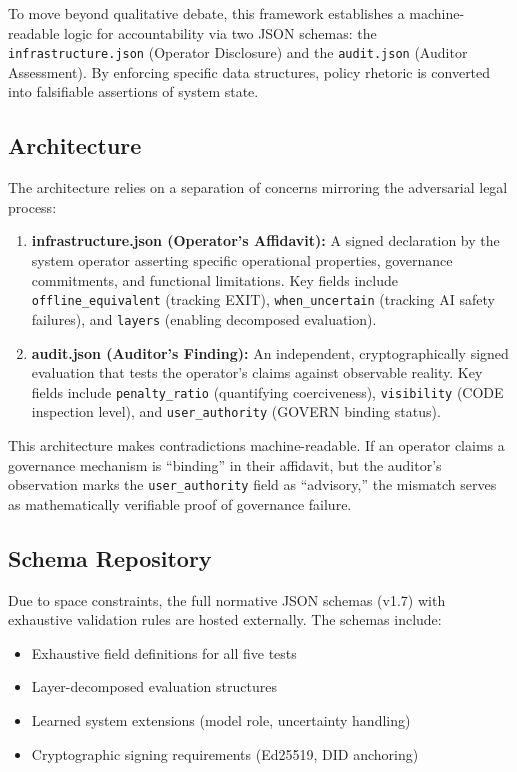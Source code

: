 \documentclass{article}
\begin{document}
\medskip

To move beyond qualitative debate, this framework establishes a machine-readable logic for accountability via two JSON schemas: the \texttt{infrastructure.json} (Operator Disclosure) and the \texttt{audit.json} (Auditor Assessment). By enforcing specific data structures, policy rhetoric is converted into falsifiable assertions of system state.

\subsection{Architecture}

The architecture relies on a separation of concerns mirroring the adversarial legal process:

\begin{enumerate}[noitemsep]
    \item \textbf{infrastructure.json (Operator's Affidavit):} A signed declaration by the system operator asserting specific operational properties, governance commitments, and functional limitations. Key fields include \texttt{offline\_equivalent} (tracking EXIT), \texttt{when\_uncertain} (tracking AI safety failures), and \texttt{layers} (enabling decomposed evaluation).

    \item \textbf{audit.json (Auditor's Finding):} An independent, cryptographically signed evaluation that tests the operator's claims against observable reality. Key fields include \texttt{penalty\_ratio} (quantifying coerciveness), \texttt{visibility} (CODE inspection level), and \texttt{user\_authority} (GOVERN binding status).
\end{enumerate}

This architecture makes contradictions machine-readable. If an operator claims a governance mechanism is ``binding'' in their affidavit, but the auditor's observation marks the \texttt{user\_authority} field as ``advisory,'' the mismatch serves as mathematically verifiable proof of governance failure.

\subsection{Schema Repository}

Due to space constraints, the full normative JSON schemas (v1.7) with exhaustive validation rules are hosted externally. The schemas include:

\begin{itemize}[noitemsep]
    \item Exhaustive field definitions for all five tests
    \item Layer-decomposed evaluation structures
    \item Learned system extensions (model role, uncertainty handling)
    \item Cryptographic signing requirements (Ed25519, DID anchoring)
\end{itemize}
\end{document}
